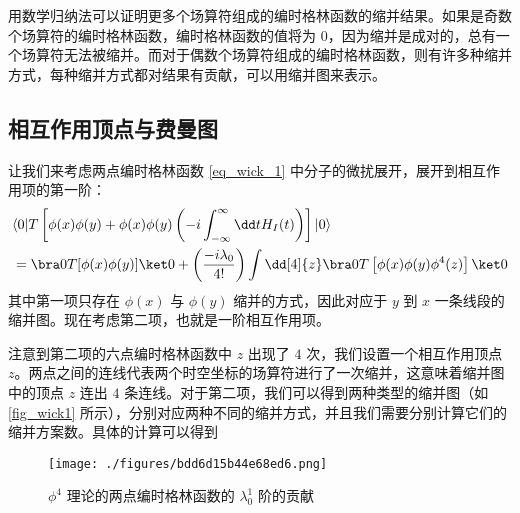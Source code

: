 用数学归纳法可以证明更多个场算符组成的编时格林函数的缩并结果。如果是奇数个场算符的编时格林函数，编时格林函数的值将为 $0$，因为缩并是成对的，总有一个场算符无法被缩并。而对于偶数个场算符组成的编时格林函数，则有许多种缩并方式，每种缩并方式都对结果有贡献，可以用缩并图来表示。
\subsection{相互作用顶点与费曼图}
让我们来考虑两点编时格林函数 \autoref{eq_wick_1} 中分子的微扰展开，展开到相互作用项的第一阶：
\begin{equation}
\begin{aligned}
&\langle 0| T\left[\phi(x)\phi(y)+\phi(x)\phi(y)\left(-i\int_{-\infty}^{\infty}\dd t H_I(t)\right)\right] | 0\rangle\\
&=\bra 0 T[\phi(x)\phi(y)] \ket 0 
+\left(\frac{-i\lambda_0}{4!}\right) \int \dd[4]{z} \bra 0 T\left[ \phi(x)\phi(y)\phi^4(z) \right]\ket 0
\end{aligned}
\end{equation}
其中第一项只存在 $\phi(x)$ 与 $\phi(y)$ 缩并的方式，因此对应于 $y$ 到 $x$ 一条线段的缩并图。现在考虑第二项，也就是一阶相互作用项。

注意到第二项的六点编时格林函数中 $z$ 出现了 $4$ 次，我们设置一个相互作用顶点 $z$。两点之间的连线代表两个时空坐标的场算符进行了一次缩并，这意味着缩并图中的顶点 $z$ 连出 $4$ 条连线。对于第二项，我们可以得到两种类型的缩并图（如 \autoref{fig_wick1} 
所示），分别对应两种不同的缩并方式，并且我们需要分别计算它们的缩并方案数。具体的计算可以得到

\begin{figure}[ht]
\centering
\texttt{[image: ./figures/bdd6d15b44e68ed6.png]}
\caption{$\phi^4$ 理论的两点编时格林函数的 $\lambda_0^1$ 阶的贡献} \label{fig_wick1}
\end{figure}
